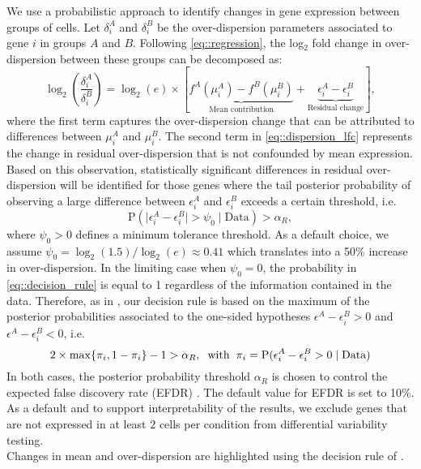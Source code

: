 We use a probabilistic approach to identify changes in gene expression between groups of cells. Let $\delta_i^A$ and $\delta_i^B$ be the over-dispersion parameters associated to gene $i$ in groups $A$ and $B$. Following \ref{eq::regression}, the log$_2$ fold change in over-dispersion between these groups can be decomposed as: \begin{equation} \label{eq::dispersion_lfc}
\log_2 \left( \frac{\delta_i^A}{\delta_i^B}\right) = \log_2(e) \times \left[\underbrace{f^A(\mu_i^A) - f^B(\mu_i^B) }_{\text{Mean contribution}} + \underbrace{\epsilon_i^A - \epsilon_i^B}_{\text{Residual change}} \right],
\end{equation} where the first term captures the over-dispersion change that can be attributed to differences between $\mu_i^A$ and $\mu_i^B$. The second term in \ref{eq::dispersion_lfc} represents the change in residual over-dispersion that is not confounded by mean expression. Based on this observation, statistically significant differences in residual over-dispersion will be identified for those genes where the tail posterior probability of observing a large difference between $\epsilon_i^A$ and $\epsilon_i^B$ exceeds a certain threshold, i.e.~\begin{equation} \label{eq::decision_rule}
\text{P}(\mid\epsilon_i^{A}-\epsilon_i^{B}\mid >\psi_0 \mid \text{Data} ) >\alpha_R,
\end{equation} 
where $\psi_0 > 0$ defines a minimum tolerance threshold. As a default choice, we assume $\psi_0 = \log_2(1.5) / \log_2(e) \approx 0.41$ which translates into a 50\% increase in over-dispersion. In the limiting case when $\psi_0 = 0$, the probability in \eqref{eq::decision_rule} is equal to 1 regardless of the information contained in the data. Therefore, as in \cite{Bochkina2007}, our decision rule is based on the maximum of the posterior probabilities associated to the one-sided hypotheses $\epsilon^A - \epsilon^B_i > 0$ and  $\epsilon^A - \epsilon^B_i < 0$, i.e. \begin{equation} \label{eq::decision_rule2} 2 \times \max\{\pi_i, 1-\pi_i\} - 1  >\alpha_R, \hspace{0.2cm} \text{with} \hspace{0.2cm} \pi_i = \text{P}(\epsilon_i^{A}-\epsilon_i^{B} > 0 \mid \text{Data})
\end{equation}In both cases, the posterior probability threshold $\alpha_R$ is chosen to control the expected false discovery rate (EFDR) \citep{Newton2004}. The default value for EFDR is set to 10\%.
As a default and to support interpretability of the results, we exclude genes that are not expressed in at least 2 cells per condition from differential variability testing.\\
Changes in mean and over-dispersion are highlighted using the decision rule of \cite{Vallejos2016a}. \\

